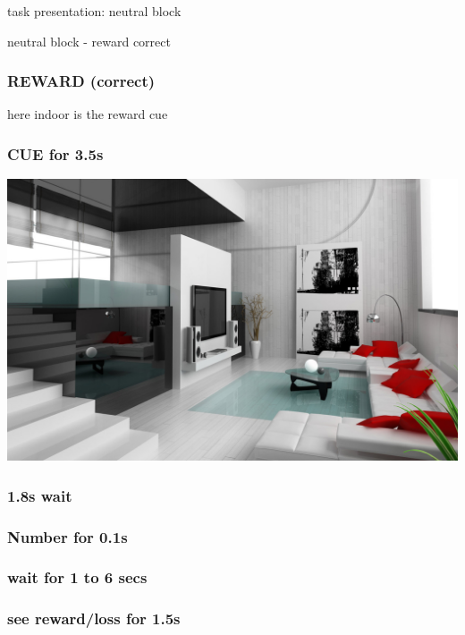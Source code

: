 \documentclass{beamer}
\begin{document}
\begin{section}{task presentation: neutral block}
\begin{subsection}{neutral block - reward correct}
\begin{frame} \frametitle{REWARD (correct)} here indoor is the reward cue \end{frame}
\begin{frame} \frametitle{CUE for 3.5s}
   \begin{center}
	\includegraphics[width=.5\textwidth]{../imgs/Scenes/Indoors/living-room-interior-design.jpg} \\
   \end{center}
\end{frame}

\begin{frame} \frametitle{1.8s wait} \end{frame}
\begin{frame} \frametitle{Number for 0.1s}  \end{frame}
\begin{frame} \frametitle{wait for 1 to 6 secs} \end{frame}
\begin{frame} 
 \frametitle{see reward/loss for 1.5s}
   \begin{center}
   \end{center}
\end{frame}
\end{subsection}




\end{section}
\end{document}
